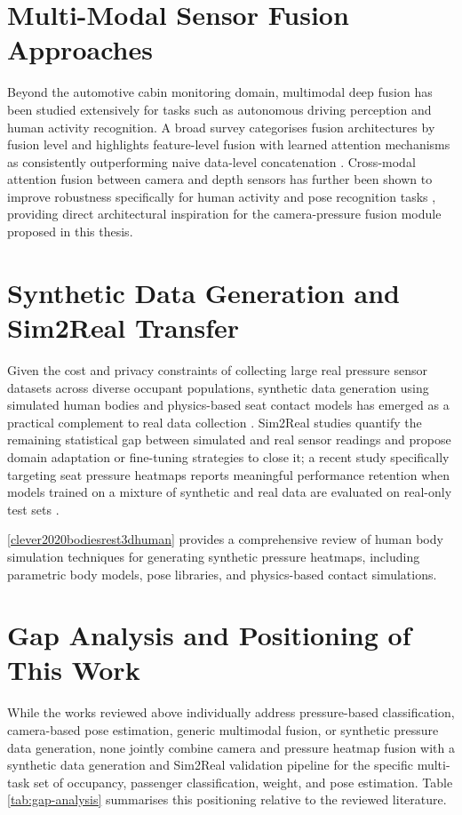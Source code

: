 \section{Multi-Modal Sensor Fusion Approaches}
\label{sec:related-fusion}
Beyond the automotive cabin monitoring domain, multimodal deep fusion has
been studied extensively for tasks such as autonomous driving perception
and human activity recognition. A broad survey categorises fusion
architectures by fusion level and highlights feature-level fusion with
learned attention mechanisms as consistently outperforming naive
data-level concatenation \cite{chen2020multimodal}. Cross-modal attention
fusion between camera and depth sensors has further been shown to improve
robustness specifically for human activity and pose recognition tasks
\cite{oliveira2022crossmodal}, providing direct architectural inspiration
for the camera-pressure fusion module proposed in this thesis.



\section{Synthetic Data Generation and Sim2Real Transfer}
\label{sec:related-sim2real}
Given the cost and privacy constraints of collecting large real pressure
sensor datasets across diverse occupant populations, synthetic data
generation using simulated human bodies and physics-based seat contact
models has emerged as a practical complement to real data collection
\cite{ivanov2021synthetic}. Sim2Real studies quantify the remaining
statistical gap between simulated and real sensor readings and propose
domain adaptation or fine-tuning strategies to close it; a recent study
specifically targeting seat pressure heatmaps reports meaningful
performance retention when models trained on a mixture of synthetic and
real data are evaluated on real-only test sets \cite{lindqvist2023sim2real}.

\ref{clever2020bodiesrest3dhuman} provides a comprehensive review of human body simulation techniques for generating synthetic pressure heatmaps, including parametric body models, pose libraries, and physics-based contact simulations.

\section{Gap Analysis and Positioning of This Work}
\label{sec:gap-analysis}
While the works reviewed above individually address pressure-based
classification, camera-based pose estimation, generic multimodal fusion,
or synthetic pressure data generation, none jointly combine camera and
pressure heatmap fusion with a synthetic data generation and Sim2Real
validation pipeline for the specific multi-task set of occupancy,
passenger classification, weight, and pose estimation. Table
\ref{tab:gap-analysis} summarises this positioning relative to the
reviewed literature.

